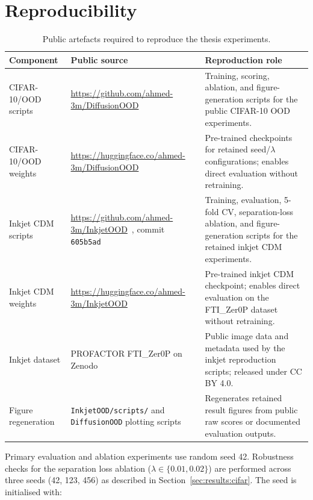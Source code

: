 \clearpage
\section{Reproducibility}
\label{app:experimental-config:reproducibility}

\begin{table}[htbp]
  \centering
  \caption{Public artefacts required to reproduce the thesis experiments.}
  \label{tab:appC:artifact-availability}
  \small
  \begin{tabularx}{\textwidth}{p{2.7cm}p{4.6cm}X}
    \toprule
    Component & Public source & Reproduction role \\
    \midrule
    CIFAR-10/OOD scripts & \url{https://github.com/ahmed-3m/DiffusionOOD} & Training, scoring, ablation, and figure-generation scripts for the public CIFAR-10 OOD experiments. \\
    CIFAR-10/OOD weights & \url{https://huggingface.co/ahmed-3m/DiffusionOOD} & Pre-trained checkpoints for retained seed/\(\lambda\) configurations; enables direct evaluation without retraining. \\
    Inkjet CDM scripts & \url{https://github.com/ahmed-3m/InkjetOOD}~\cite{mohammed2026inkjetood}, commit \texttt{605b5ad} & Training, evaluation, 5-fold CV, separation-loss ablation, and figure-generation scripts for the retained inkjet CDM experiments. \\
    Inkjet CDM weights & \url{https://huggingface.co/ahmed-3m/InkjetOOD} & Pre-trained inkjet CDM checkpoint; enables direct evaluation on the FTI\_Zer0P dataset without retraining. \\
    Inkjet dataset & PROFACTOR FTI\_Zer0P on Zenodo~\citep{profactor2024fti} & Public image data and metadata used by the inkjet reproduction scripts; released under CC BY 4.0. \\
    Figure regeneration & \texttt{InkjetOOD/scripts/} and \texttt{DiffusionOOD} plotting scripts & Regenerates retained result figures from public raw scores or documented evaluation outputs. \\
    \bottomrule
  \end{tabularx}
\end{table}

Primary evaluation and ablation experiments use random seed 42. Robustness checks for the separation loss ablation ($\lambda \in \{0.01, 0.02\}$) are performed across three seeds (42, 123, 456) as described in Section~\ref{sec:results:cifar}. The seed is initialised with:

